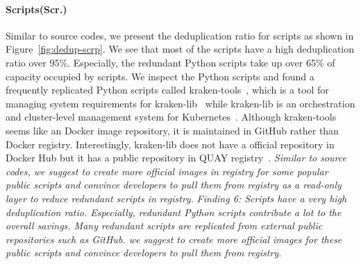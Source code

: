 \paragraph{Scripts(Scr.)}
%
%
Similar to source codes, we present the deduplication ratio for scripts as shown in
Figure~\ref{fig:dedup-scrp}.
We see that most of the scripts have a high deduplication ratio over 95\%. Especially, the redundant Python scripts take up over 65\% of capacity occupied by scripts. 
%
We inspect the Python scripts and found a frequently replicated Python scripts called kraken-tools~\cite{xxx}, which is a tool for managing system requirements for kraken-lib~\cite{xxx} while kraken-lib is an orchestration and cluster-level management system for Kubernetes~\cite{xxx}.
Although kraken-tools seems like an Docker image repository, it is maintained in GitHub rather than Docker registry. Interestingly, kraken-lib does not have a official repository in Docker Hub but it has a public repository in QUAY registry~\cite{xxx}.
\textit{Similar to source codes, we suggest to create more official images in registry for some popular public scripts %
and convince developers to pull them from registry as a read-only layer to reduce redundant scripts in registry.}
%
\textit{Finding 6: Scripts have a very high deduplication ratio. Especially, redundant Python scripts contribute a lot to the overall savings. Many redundant scripts are replicated from external public repositories such as GitHub. 
we suggest to create more official images for these public scripts and convince developers to pull them from registry.}
%
